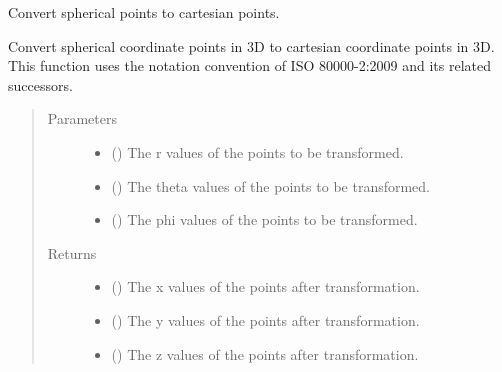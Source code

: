 \documentclass[letterpaper,10pt,english]{sphinxmanual}
\begin{document}
\begin{fulllineitems}
\label{\detokenize{Backend.coordinate_system_transformation:Backend.coordinate_system_transformation.spherical_to_cartesian_3d}}
Convert spherical points to cartesian points.

Convert spherical coordinate points in 3D to cartesian coordinate points
in 3D. This function uses the notation convention of ISO 80000-2:2009 and
its related successors.
\begin{quote}\begin{description}
\item[{Parameters}] \leavevmode\begin{itemize}
\item {} 
 () \textendash{} The r values of the points to be transformed.

\item {} 
 () \textendash{} The theta values of the points to be transformed.

\item {} 
 () \textendash{} The phi values of the points to be transformed.

\end{itemize}

\item[{Returns}] \leavevmode
\begin{itemize}
\item {} 
 () \textendash{} The x values of the points after transformation.

\item {} 
 () \textendash{} The y values of the points after transformation.

\item {} 
 () \textendash{} The z values of the points after transformation.

\end{itemize}


\end{description}\end{quote}

\end{fulllineitems}
\end{document}
